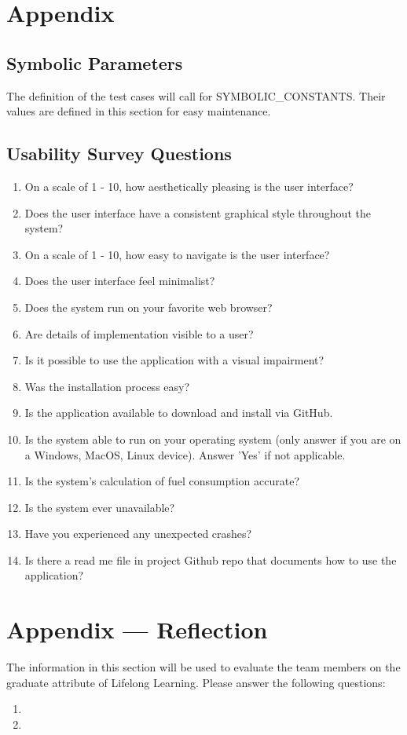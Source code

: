 \documentclass[12pt, titlepage]{article}
\begin{document}
\newpage





\newpage

\section{Appendix}

\subsection{Symbolic Parameters}

The definition of the test cases will call for SYMBOLIC\_CONSTANTS.
Their values are defined in this section for easy maintenance.

\subsection{Usability Survey Questions}

\begin{enumerate}
  \item On a scale of 1 - 10, how aesthetically pleasing is the user interface?
  \item Does the user interface have a consistent graphical style throughout the system?
  \item On a scale of 1 - 10, how easy to navigate is the user interface?
  \item Does the user interface feel minimalist?
  \item Does the system run on your favorite web browser?
  \item Are details of implementation visible to a user?
  \item Is it possible to use the application with a visual impairment?
  \item Was the installation process easy?
  \item Is the application available to download and install via GitHub.
  \item Is the system able to run on your operating system (only answer if you are on a Windows, MacOS, Linux device). Answer 'Yes' if not applicable.
  \item Is the system's calculation of fuel consumption accurate?
  \item Is the system ever unavailable?
  \item Have you experienced any unexpected crashes?
  \item Is there a read me file in project Github repo that documents how to use the application?
\end{enumerate}

\newpage{}
\section*{Appendix --- Reflection}

The information in this section will be used to evaluate the team members on the
graduate attribute of Lifelong Learning.  Please answer the following questions:

\begin{enumerate}
  \item 
  \item 
\end{enumerate}
\end{document}

